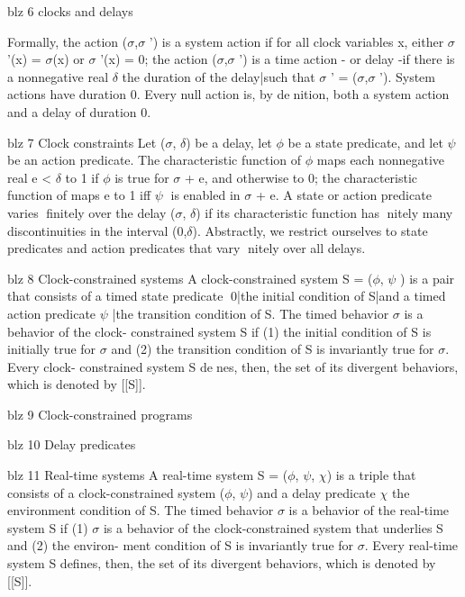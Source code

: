blz 6 clocks and delays

Formally, the action ($\sigma$,$\sigma$ ') is a system action if for all clock variables x, either
$\sigma$ '(x) = $\sigma$(x) or $\sigma$ '(x) = 0; the action ($\sigma$,$\sigma$ ') is a time action - or delay -if there
is a nonnegative real $\delta$ the duration of the delay|such that $\sigma$ ' = ($\sigma$,$\sigma$ '). System
actions have duration 0. Every null action is, by denition, both a system action and a delay of duration 0.



blz 7 Clock constraints
Let ($\sigma$, $\delta$) be a delay, let $\phi$ be a state predicate, and let $\psi$  be an action
predicate. The characteristic function of $\phi$ maps each nonnegative real e < $\delta$ to
1 if $\phi$ is true for $\sigma$ + e, and otherwise to 0; the characteristic function of   maps
e to 1 iff $\psi$   is enabled in $\sigma$ + e. A state or action predicate varies finitely over the
delay ($\sigma$, $\delta$) if its characteristic function has nitely many discontinuities in the
interval (0,$\delta$). Abstractly, we restrict ourselves to state predicates and action
predicates that vary nitely over all delays.


blz 8 Clock-constrained systems
A clock-constrained system S = ($\phi$, $\psi$ ) is a pair that consists of a timed state
predicate 0|the initial condition of S|and a timed action predicate $\psi$ |the
transition condition of S. The timed behavior $\sigma$ is a behavior of the clock-
constrained system S if (1) the initial condition of S is initially true for $\sigma$
and (2) the transition condition of S is invariantly true for $\sigma$. Every clock-
constrained system S denes, then, the set of its divergent behaviors, which is
denoted by [[S]].



blz 9 Clock-constrained programs


blz 10 Delay predicates


blz 11 Real-time systems
A real-time system S = ($\phi$, $\psi$, $\chi$) is a triple that consists of a clock-constrained system ($\phi$, $\psi$) and a delay predicate $\chi$ the environment condition
of S. The timed behavior $\sigma$ is a behavior of the real-time system S if (1) $\sigma$ is a
behavior of the clock-constrained system that underlies S and (2) the environ-
ment condition of S is invariantly true for $\sigma$. Every real-time system S defines,
then, the set of its divergent behaviors, which is denoted by [[S]].

